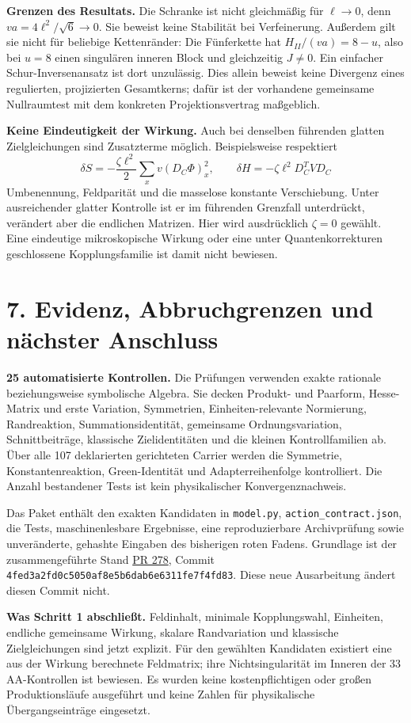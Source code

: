 \documentclass[10pt,a4paper]{article}
\newcommand{\sect}[1]{\section*{\color{navy}#1}}
\begin{document}
\textbf{Grenzen des Resultats.}
Die Schranke ist nicht gleichmäßig für $\ell\to0$, denn
$va=4\ell^2/\sqrt6\to0$. Sie beweist keine Stabilität bei Verfeinerung.
Außerdem gilt sie nicht für beliebige Kettenränder: Die Fünferkette hat
$H_{II}/(va)=8-u$, also bei $u=8$ einen singulären inneren Block und
gleichzeitig $J\ne0$. Ein einfacher Schur-Inversenansatz ist dort
unzulässig. Dies allein beweist keine Divergenz eines regulierten,
projizierten Gesamtkerns; dafür ist der vorhandene gemeinsame
Nullraumtest mit dem konkreten Projektionsvertrag maßgeblich.

\textbf{Keine Eindeutigkeit der Wirkung.}
Auch bei denselben führenden glatten Zielgleichungen sind Zusatzterme
möglich. Beispielsweise respektiert
\[
\delta S=-\frac{\zeta\ell^2}{2}\sum_xv(D_C\Phi)_x^2,
\qquad
\delta H=-\zeta\ell^2D_C^TVD_C
\]
Umbenennung, Feldparität und die masselose konstante Verschiebung.
Unter ausreichender glatter Kontrolle ist er im führenden Grenzfall
unterdrückt, verändert aber die endlichen Matrizen. Hier wird ausdrücklich
$\zeta=0$ gewählt. Eine eindeutige mikroskopische Wirkung oder eine unter
Quantenkorrekturen geschlossene Kopplungsfamilie ist damit nicht bewiesen.

\newpage
\sect{7. Evidenz, Abbruchgrenzen und nächster Anschluss}
\textbf{25 automatisierte Kontrollen.}
Die Prüfungen verwenden exakte rationale beziehungsweise symbolische
Algebra. Sie decken Produkt- und Paarform, Hesse-Matrix und erste
Variation, Symmetrien, Einheiten-relevante Normierung, Randreaktion,
Summationsidentität, gemeinsame Ordnungsvariation, Schnittbeiträge,
klassische Zielidentitäten und die kleinen Kontrollfamilien ab.
Über alle 107 deklarierten gerichteten Carrier werden die Symmetrie,
Konstantenreaktion, Green-Identität und Adapterreihenfolge kontrolliert.
Die Anzahl bestandener Tests ist kein physikalischer Konvergenznachweis.

Das Paket enthält den exakten Kandidaten in \texttt{model.py},
\texttt{action\_contract.json}, die Tests, maschinenlesbare Ergebnisse,
eine reproduzierbare Archivprüfung sowie unveränderte, gehashte Eingaben
des bisherigen roten Fadens. Grundlage ist der zusammengeführte Stand
\href{https://github.com/thomasmgfeller/x6-spectral-astrolabium/pull/278}{PR 278},
Commit\\{\small\texttt{4fed3a2fd0c5050af8e5b6dab6e6311fe7f4fd83}}.
Diese neue Ausarbeitung ändert diesen Commit nicht.

\textbf{Was Schritt 1 abschließt.}
Feldinhalt, minimale Kopplungswahl, Einheiten, endliche gemeinsame Wirkung,
skalare Randvariation und klassische Zielgleichungen sind jetzt explizit.
Für den gewählten Kandidaten existiert eine aus der Wirkung berechnete
Feldmatrix; ihre Nichtsingularität im Inneren der 33 AA-Kontrollen ist
bewiesen. Es wurden keine kostenpflichtigen oder großen Produktionsläufe
ausgeführt und keine Zahlen für physikalische Übergangseinträge eingesetzt.
\end{document}

